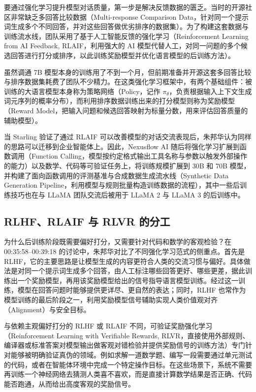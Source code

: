 \documentclass[UTF8,a4paper,11pt,fontset=fandol]{ctexart}
\begin{document}
要通过强化学习提升模型对话质量，第一步是解决反馈数据的匮乏。当时的开源社区非常缺乏多回答比较数据（Multi-response Comparison Data，针对同一个提示词生成多个不同回答，并对这些回答做优劣排序的数据集）。为了构建这套数据与训练流水线，团队采用了基于人工智能反馈的强化学习（Reinforcement Learning from AI Feedback, RLAIF，利用强大的 AI 模型代替人工，对同一问题的多个候选回答进行打分或排序，以此训练奖励模型并优化语言模型的后训练方法）。

虽然调通 7B 模型本身的训练用了不到一个月，但前期准备并开源这套多回答比较与排序数据集耗费了团队不少精力。在这类强化学习框架中，有两个基础组件：被训练的大语言模型本身称为策略网络（Policy，记作 \(\pi_\theta\)，负责根据输入上下文生成词元序列的概率分布），而利用排序数据训练出来的打分模型则称为奖励模型（Reward Model，把输入问题和候选回答映射为标量分数，用来评估回答质量的辅助模型）。

当 Starling 验证了通过 RLAIF 可以改善模型的对话交流表现后，朱邦华认为同样的思路可以迁移到企业智能体上。因此，Nexusflow AI 随后将强化学习扩展到函数调用（Function Calling，模型按约定格式输出工具名称与参数以触发外部操作的能力）以及数学、代码等可验证任务上，将训练规模扩展到 30B 和 70B 模型，并构建了面向函数调用的评测基准与合成数据生成流水线（Synthetic Data Generation Pipeline，利用模型与规则批量构造训练数据的流程），其中一些后训练技巧也在与 LLaMA 团队交流后被用于 LLaMA 2 与 LLaMA 3 的后训练中。

\subsection{RLHF、RLAIF 与 RLVR 的分工}
为什么后训练阶段既需要偏好打分，又需要针对代码和数学的客观检验？在 00:35:58–00:39:18 的讨论中，朱邦华对比了不同强化学习范式的侧重点。首先是 RLHF，它的主要思路是让模型生成的内容更符合人类的交流习惯与偏好。具体做法是对同一个提示词生成多个回答，由人工标注哪些回答更好、哪些更差，据此训练出一个奖励模型，再用该奖励模型给出的信号指导语言模型训练。经过这一训练，模型在回答问题时能够提供更详尽、更自然的表达；同时，RLHF 也常作为模型训练的最后阶段之一，利用奖励模型信号辅助实现人类价值观对齐（Alignment）与安全目标。

与依赖主观偏好打分的 RLHF 或 RLAIF 不同，可验证奖励强化学习（Reinforcement Learning with Verifiable Rewards, RLVR，直接使用外部规则、编译器或标准答案对模型输出做客观对错检验并提供奖励信号的训练方法）专门针对能够被明确验证真伪的领域。例如求解一道数学题、编写一段需要通过单元测试的代码，或者在智能体环境中完成一个特定操作目标。在这些场景下，系统不需要再训练一个神经网络去猜测人类喜不喜欢，而是直接计算数学结果是否正确、代码能否跑通，从而给出高度客观的奖励信号。
\end{document}
